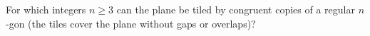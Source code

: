 For which integers $n\ge3$ can the plane be tiled by congruent copies of a regular $n$-gon (the tiles cover the plane without gaps or overlaps)?
